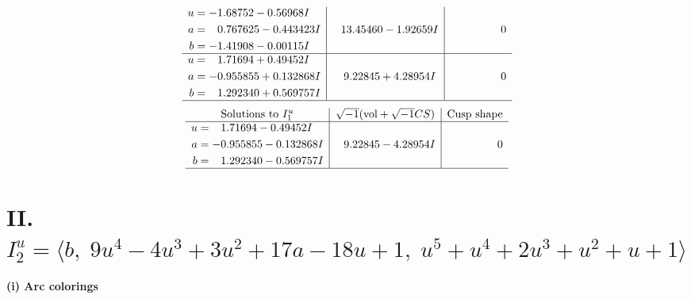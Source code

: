 \documentclass[1p]{elsarticle_modified}
\theoremstyle{definition}
\newcommand{\I}{\sqrt{-1}}
\begin{document}
$$\begin{array}{c|c|c}
\begin{aligned}
u &= -1.68752 - 0.56968 I \\
a &= \phantom{-}0.767625 - 0.443423 I \\
b &= -1.41908 - 0.00115 I\end{aligned}
 & \phantom{-}13.45460 - 1.92659 I & \phantom{-0.000000 } 0 \\ \hline\begin{aligned}
u &= \phantom{-}1.71694 + 0.49452 I \\
a &= -0.955855 + 0.132868 I \\
b &= \phantom{-}1.292340 + 0.569757 I\end{aligned}
 & \phantom{-}9.22845 + 4.28954 I & \phantom{-0.000000 } 0\\
 \hline 
 \end{array}$$\newpage$$\begin{array}{c|c|c}  
\text{Solutions to }I^u_{1}& \I (\text{vol} + \sqrt{-1}CS) & \text{Cusp shape}\\
 \hline 
\begin{aligned}
u &= \phantom{-}1.71694 - 0.49452 I \\
a &= -0.955855 - 0.132868 I \\
b &= \phantom{-}1.292340 - 0.569757 I\end{aligned}
 & \phantom{-}9.22845 - 4.28954 I & \phantom{-0.000000 } 0\\
 \hline 
 \end{array}$$\newpage\newpage\renewcommand{\arraystretch}{1}
\centering \section*{II. $I^u_{2}= \langle b,\;9 u^4-4 u^3+3 u^2+17 a-18 u+1,\;u^5+u^4+2 u^3+u^2+u+1 \rangle$}
\flushleft \textbf{(i) Arc colorings}\\
\end{document}
